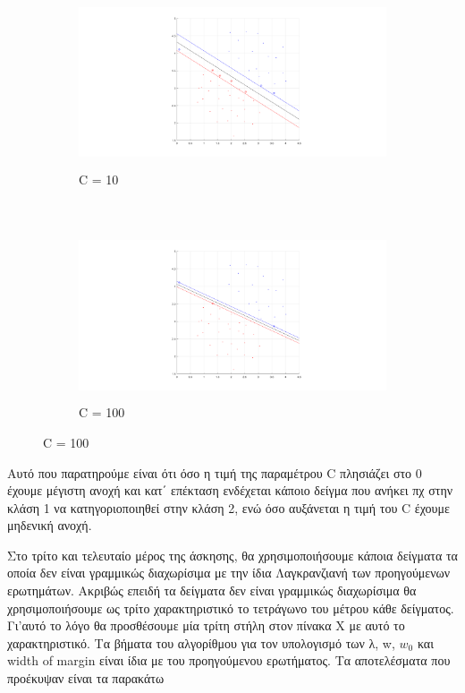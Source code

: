 \documentclass{article}
\begin{document}
	\begin{figure}[h!]
		\centering
		\begin{subfigure}[t]{0.5\textwidth}
			\centering
			\includegraphics[height=5cm, width=\linewidth]{../exercise2_6/images/ex6_ex2_C_10.png}
			\caption{C = 10}
		\end{subfigure}%
		~
		\begin{subfigure}[t]{0.5\textwidth}
			\centering
			\includegraphics[height=5cm, width=\linewidth]{../exercise2_6/images/ex6_ex2_C_100.png}
			\caption{C = 100}
		\end{subfigure}
	\end{figure}
 	\noindent
 	Αυτό που παρατηρούμε είναι ότι όσο η τιμή της παραμέτρου C πλησιάζει στο 0 έχουμε μέγιστη ανοχή και κατ΄ επέκταση ενδέχεται κάποιο δείγμα που ανήκει πχ στην κλάση 1 να κατηγοριοποιηθεί στην κλάση 2, ενώ όσο αυξάνεται η τιμή του C έχουμε μηδενική ανοχή. 
 	
 	\noindent
 	Στο τρίτο και τελευταίο μέρος της άσκησης, θα χρησιμοποιήσουμε κάποια δείγματα τα οποία δεν είναι γραμμικώς διαχωρίσιμα με την ίδια Λαγκρανζιανή των προηγούμενων ερωτημάτων. Ακριβώς επειδή τα δείγματα δεν είναι γραμμικώς διαχωρίσιμα θα χρησιμοποιήσουμε ως τρίτο χαρακτηριστικό το τετράγωνο του μέτρου κάθε δείγματος. Γι'αυτό το λόγο θα προσθέσουμε μία τρίτη στήλη στον πίνακα Χ με αυτό το χαρακτηριστικό. Tα βήματα του αλγορίθμου για τον υπολογισμό των λ, w, $w_{0}$ και width of margin είναι ίδια με του προηγούμενου ερωτήματος. Τα αποτελέσματα που προέκυψαν είναι τα παρακάτω 
 	
\end{document}
